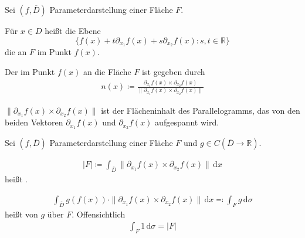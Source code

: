 \documentclass[a4paper,10pt]{scrbook}
\begin{document}
\begin{theorem}[Definition]
  Sei $(f,\overline{D})$ Parameterdarstellung einer Fläche $F$.
  \begin{enum-arab}
    \item Für $x \in D$ heißt die Ebene \[ \{ f(x) + t \partial_{x_1} f(x) + s \partial_{x_2} f(x) : s,t \in \mathbb{R} \} \] die  an $F$ im Punkt $f(x)$.

    \item Der  im Punkt $f(x)$ an die Fläche $F$ ist gegeben durch
    \begin{align*}
      n(x) \coloneq \frac{\partial_{x_1} f(x) \times \partial_{x_2} f(x)}{\| \partial_{x_1} f(x) \times \partial_{x_2} f(x) \|}
    \end{align*}
  \end{enum-arab}
\end{theorem}

\begin{notice}
  $\| \partial_{x_1} f(x) \times \partial_{x_2} f(x) \|$ ist der Flächeninhalt des Parallelogramms, das von den beiden Vektoren $\partial_{x_1} f(x)$ und $\partial_{x_2} f(x)$ aufgespannt wird.
\end{notice}

\begin{theorem}[Definition]
  Sei $(f,\overline{D})$ Parameterdarstellung einer Fläche $F$ und $g \in C(\overline{D} \to \mathbb{R})$.
  \begin{enum-arab}
    \item
    \begin{align*}
      |F| \coloneq \int_{\overline{D}} \| \partial_{x_1} f(x) \times \partial_{x_2} f(x) \| \, \mathrm{d}x
    \end{align*}
    heißt .

    \item
    \begin{align*}
      \int_{\overline{D}} g(f(x)) \cdot \| \partial_{x_1} f(x) \times \partial_{x_2} f(x) \| \, \mathrm{d}x \eqcolon \int_F g \, \mathrm{d}\sigma
    \end{align*}
    heißt  von $g$ über $F$. Offensichtlich
    \begin{align*}
      \int_F 1 \, \mathrm{d}\sigma = |F|
    \end{align*}
  \end{enum-arab}
\end{theorem}
\end{document}
